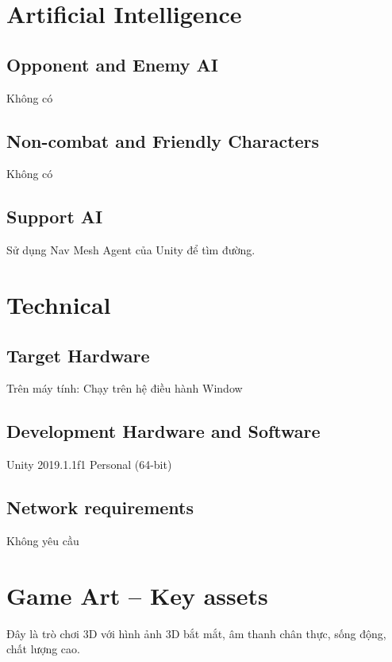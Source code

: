 \documentclass[../report.tex]{subfiles}
\begin{document}
\begin{itemize}
\section{Artificial  Intelligence}
\subsection{Opponent and Enemy AI}
Không có

\subsection{Non-combat and Friendly Characters}
Không có

\subsection{Support AI}
Sử dụng Nav Mesh Agent của Unity để tìm đường. 

\section{Technical}
\subsection{Target Hardware}
Trên máy tính: Chạy trên hệ điều hành Window
\subsection{Development Hardware and Software}
Unity 2019.1.1f1 Personal (64-bit)
\subsection{Network requirements}
Không yêu cầu
\section{Game Art – Key assets}
Đây là trò chơi 3D với hình ảnh 3D bắt mắt,
âm thanh chân thực, sống động, chất lượng cao. 


\end{itemize}
\end{document}
